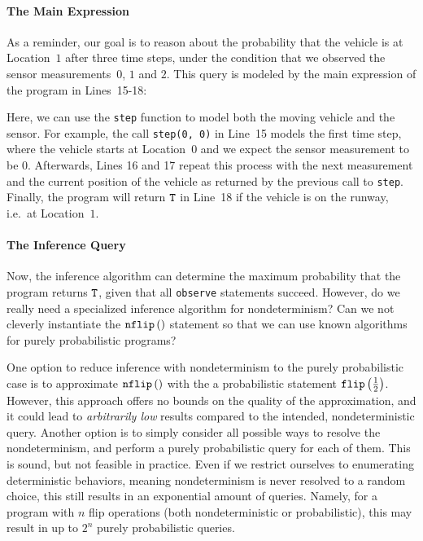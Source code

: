 \paragraph{The Main Expression}
As a reminder, our goal is to reason about the probability that the vehicle is at Location~$1$ after three time steps, under the condition that we observed the sensor measurements~$0$, $1$ and $2$.
This query is modeled by the main expression of the program in Lines~15-18:

Here, we can use the \texttt{step} function to model both the moving vehicle and the sensor. 
For example, the call \texttt{step(0, 0)} in Line~15 models the first time step, where the vehicle starts at Location~$0$ and we expect the sensor measurement to be $0$.
Afterwards, Lines 16 and 17 repeat this process with the next measurement and the current position of the vehicle as returned by the previous call to \texttt{step}.
Finally, the program will return $\texttt{T}$ in Line~18 if the vehicle is on the runway, i.e.\ at Location~$1$.


\paragraph{The Inference Query} 
Now, the \NDICE inference algorithm can determine the maximum probability that the program returns $\texttt{T}$, given that all \texttt{observe} statements succeed.
However, do we really need a specialized inference algorithm for nondeterminism? 
Can we not cleverly instantiate the $\texttt{nflip}\left(\right) $ statement so that we can use known algorithms for purely probabilistic programs?

One option to reduce inference with nondeterminism to the purely probabilistic case is to approximate $\texttt{nflip}\left(\right) $ with the a probabilistic statement $\texttt{flip} \left(\frac{1}{2}\right) $.
However, this approach offers no bounds on the quality of the approximation, and it could lead to \textit{arbitrarily low} results compared to the intended, nondeterministic query.
Another option is to simply consider all possible ways to resolve the nondeterminism, and perform a purely probabilistic query for each of them.
This is sound, but not feasible in practice.
Even if we restrict ourselves to enumerating deterministic behaviors, meaning nondeterminism is never resolved to a random choice, this still results in an exponential amount of queries.
Namely, for a program with $n$ flip operations (both nondeterministic or probabilistic), this may result in up to $2^n$ purely probabilistic queries.

